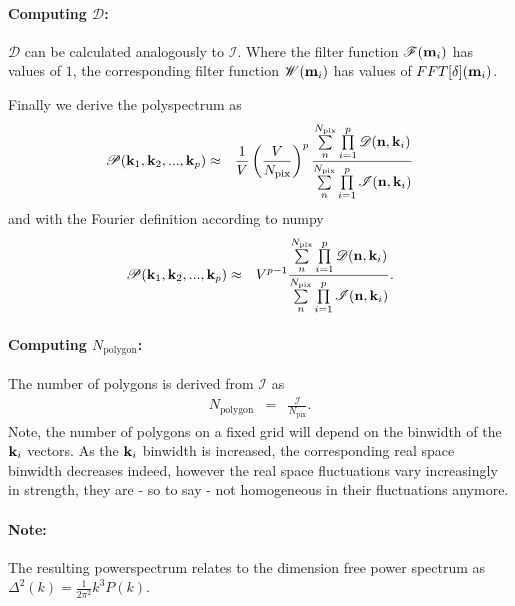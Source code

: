 \documentclass[twoside,10pt]{article}
\begin{document}
\begin{multicols}{2}
\paragraph{Computing $\mathscr{D}$:}

$\mathscr{D}$ can be calculated analogously to $\mathscr{I}$. Where the filter function $\mathscr{F}({\bf m}_i)$ has values of $1$, the corresponding filter function $\mathscr{W}({\bf m}_i)$ has values of $FFT[\delta]({\bf m}_i)$. 

Finally we derive the polyspectrum as
\begin{eqnarray}
 \mathscr{P}({\bf k}_1, {\bf k}_2, ..., {\bf k}_p) &\approx& \frac{1}{V} \left(\frac{V}{N_\mathrm{pix}}\right)^{p}  \frac{\sum\limits_{n}^{N_\mathrm{pix}} \prod\limits_{i=1}^p \mathscr{D}({\bf n}, {\bf k}_i)}{\sum\limits_{n}^{N_\mathrm{pix}} \prod\limits_{i=1}^p \mathscr{I}({\bf n}, {\bf k}_i)}
\end{eqnarray}
and with the Fourier definition according to {\sc numpy}
\begin{eqnarray}
 \mathscr{P}({\bf k}_1, {\bf k}_2, ..., {\bf k}_p) &\approx& V^{p-1}  \frac{\sum\limits_{n}^{N_\mathrm{pix}} \prod\limits_{i=1}^p \mathscr{D}({\bf n}, {\bf k}_i)}{\sum\limits_{n}^{N_\mathrm{pix}} \prod\limits_{i=1}^p \mathscr{I}({\bf n}, {\bf k}_i)}.
\end{eqnarray}


\paragraph{Computing $N_\mathrm{polygon}$:}

The number of polygons is derived from $\mathscr{I}$ as 
\begin{eqnarray}
 N_\mathrm{polygon} &=& \frac{\mathscr{I}}{N_\mathrm{pix}}.
\end{eqnarray}
Note, the number of polygons on a fixed grid will depend on the binwidth of the ${\bf k}_i$ vectors. As the ${\bf k}_i$ binwidth is increased, the corresponding real space binwidth decreases indeed, however the real space fluctuations vary increasingly in strength, they are - so to say - not homogeneous in their fluctuations anymore. 

\paragraph{Note:} The resulting powerspectrum relates to the dimension free power spectrum as $\Delta^2(k)= \frac{1}{2\pi^2} k^3 P(k)$.


\begin{thebibliography}{99} %

 
\end{thebibliography}


\end{multicols}
\end{document}
